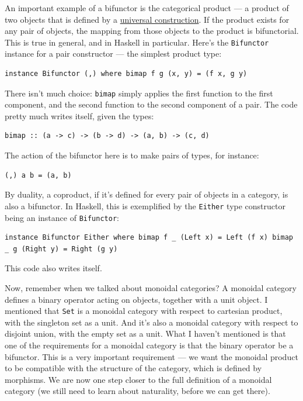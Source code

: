 An important example of a bifunctor is the categorical product --- a
product of two objects that is defined by a
\href{https://bartoszmilewski.com/2015/01/07/products-and-coproducts/}{universal
construction}. If the product exists for any pair of objects, the
mapping from those objects to the product is bifunctorial. This is true
in general, and in Haskell in particular. Here's the \texttt{Bifunctor}
instance for a pair constructor --- the simplest product type:

\begin{verbatim}
instance Bifunctor (,) where bimap f g (x, y) = (f x, g y)
\end{verbatim}

There isn't much choice: \texttt{bimap} simply applies the first
function to the first component, and the second function to the second
component of a pair. The code pretty much writes itself, given the
types:

\begin{verbatim}
bimap :: (a -> c) -> (b -> d) -> (a, b) -> (c, d)
\end{verbatim}

The action of the bifunctor here is to make pairs of types, for
instance:

\begin{verbatim}
(,) a b = (a, b)
\end{verbatim}

By duality, a coproduct, if it's defined for every pair of objects in a
category, is also a bifunctor. In Haskell, this is exemplified by the
\texttt{Either} type constructor being an instance of
\texttt{Bifunctor}:

\begin{verbatim}
instance Bifunctor Either where bimap f _ (Left x) = Left (f x) bimap _ g (Right y) = Right (g y)
\end{verbatim}

This code also writes itself.

Now, remember when we talked about monoidal categories? A monoidal
category defines a binary operator acting on objects, together with a
unit object. I mentioned that \texttt{Set} is a monoidal category with
respect to cartesian product, with the singleton set as a unit. And it's
also a monoidal category with respect to disjoint union, with the empty
set as a unit. What I haven't mentioned is that one of the requirements
for a monoidal category is that the binary operator be a bifunctor. This
is a very important requirement --- we want the monoidal product to be
compatible with the structure of the category, which is defined by
morphisms. We are now one step closer to the full definition of a
monoidal category (we still need to learn about naturality, before we
can get there).

